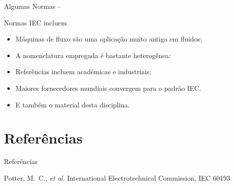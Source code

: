     \begin{frame}[allowframebreaks]{Algumas Normas -- }\vspace*{-2em}

        Normas IEC incluem

        \begin{itemize}
            \item<1-> Máquinas de fluxo são uma \alert{aplicação muito antiga} em fluidos;
            \item<1-> A \alert{nomenclatura} empregada é \alert{bastante heterogênea};
            \item<1-> Referências incluem \alert{acadêmicas} e \alert{industriais};
            \item<1-> \alert{Maiores fornecedores mundiais} convergem para o \alert{padrão IEC}.
            \item<1-> E também o material desta disciplina.
        \end{itemize}

        \pagebreak

    \end{frame}

\section{Referências}

    \begin{frame}{Referências}
        \begin{thebibliography}{Çengel, Y.~A., 2013}
                Potter, M.~C., \textit{et al.\/}
                International Electrotechnical Commission, \alert{IEC 60193}
        \end{thebibliography}
    \end{frame}




